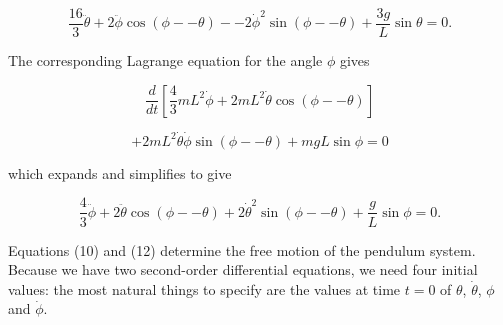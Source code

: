   \begin{equation*}\dfrac{16}{3}\ddot{\theta}+ 2\ddot{\phi}\cos (\phi -- 
  \theta) -- 2 \dot{\phi}^2 \sin (\phi -- \theta) + \dfrac{3g}{L} \sin \theta = 
  0. \tag{10}\end{equation*} 

  The corresponding Lagrange equation for the angle $\phi$ gives 

  \begin{equation*}\dfrac{d}{dt}\left[\dfrac{4}{3}mL^2 \dot{\phi} + 2mL^2 
  \dot{\theta} \cos (\phi -- \theta) \right] \end{equation*} 

  \begin{equation*}+2mL^2 \dot{\theta} \dot{\phi} \sin (\phi -- \theta) + mgL 
  \sin \phi = 0 \tag{11}\end{equation*} 

  \noindent{}which expands and simplifies to give 

  \begin{equation*}\dfrac{4}{3}\ddot{\phi}+ 2\ddot{\theta}\cos (\phi -- \theta) 
  + 2 \dot{\theta}^2 \sin (\phi -- \theta) + \dfrac{g}{L} \sin \phi = 0. 
  \tag{12}\end{equation*} 

  Equations (10) and (12) determine the free motion of the pendulum system. 
  Because we have two second-order differential equations, we need four initial 
  values: the most natural things to specify are the values at time $t=0$ of 
  $\theta$, $\dot{\theta}$, $\phi$ and $\dot{\phi}$. 